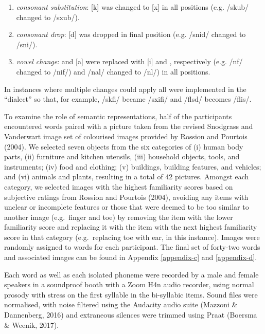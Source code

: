 \documentclass[doc,floatsintext]{apa6}
\begin{document}
\begin{enumerate}
\def\labelenumi{(\alph{enumi})}
\item
  \emph{consonant substitution}: {[}k{]} was changed to {[}x{]} in all
  positions (e.g. /skub/ changed to /sxub/).
\item
  \emph{consonant drop}: {[}d{]} was dropped in final position (e.g.
  /snid/ changed to /sni/).
\item
  \emph{vowel change}: \textipa{[E]} and {[}a{]} were replaced with
  {[}i{]} and \textipa{[O]}, respectively (e.g. /nf/ changed
  to /nif/) and /nal/ changed to /nl/) in all positions.
\end{enumerate}

In instances where multiple changes could apply all were implemented in
the \enquote{dialect} so that, for example, /skfi/ became
/sxifi/ and /flsd/ becomes /flis/.

To examine the role of semantic representations, half of the
participants encountered words paired with a picture taken from the
revised Snodgrass and Vanderwart image set of colourised images provided
by Rossion and Pourtois (2004). We selected seven objects from the six
categories of (i) human body parts, (ii) furniture and kitchen utensils,
(iii) household objects, tools, and instruments; (iv) food and clothing;
(v) buildings, building features, and vehicles; and (vi) animals and
plants, resulting in a total of 42 pictures. Amongst each category, we
selected images with the highest familiarity scores based on subjective
ratings from Rossion and Pourtois (2004), avoiding any items with
unclear or incomplete features or those that were deemed to be too
similar to another image (e.g.~finger and toe) by removing the item with
the lower familiarity score and replacing it with the item with the next
highest familiarity score in that category (e.g.~replacing toe with ear,
in this instance). Images were randomly assigned to words for each
participant. The final set of forty-two words and associated images can
be found in Appendix \ref{appendix-c} and \ref{appendix-d}.

Each word as well as each isolated phoneme were recorded by a male and
female speakers in a soundproof booth with a Zoom H4n audio recorder,
using normal prosody with stress on the first syllable in the
bi-syllabic items. Sound files were normalised, with noise filtered
using the Audacity audio suite (Mazzoni \& Dannenberg, 2016) and
extraneous silences were trimmed using Praat (Boersma \& Weenik, 2017).
\end{document}
